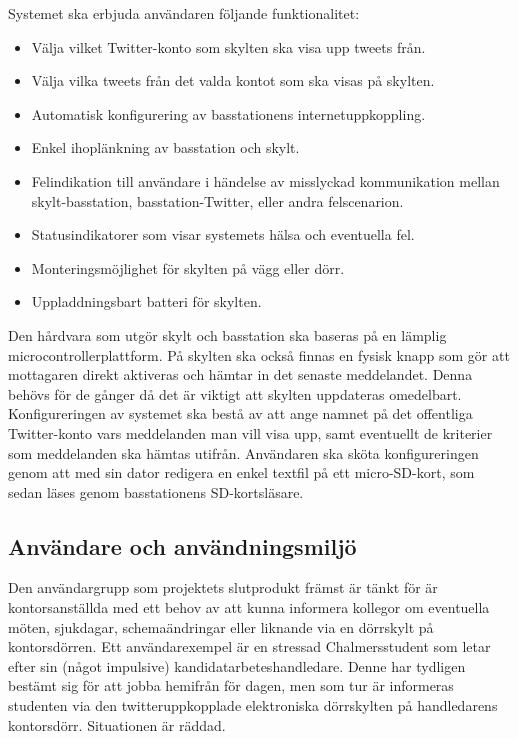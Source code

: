 \documentclass[a4paper,11pt]{article}
\begin{document}
Systemet ska erbjuda användaren följande funktionalitet:
	\begin{itemize}
    	\item Välja vilket Twitter-konto som skylten ska visa upp tweets från.
    	\item Välja vilka tweets från det valda kontot som ska visas på skylten.
    	\item Automatisk konfigurering av basstationens internetuppkoppling.
    	\item Enkel ihoplänkning av basstation och skylt.
    	\item Felindikation till användare i händelse av misslyckad kommunikation mellan skylt-basstation, basstation-Twitter, eller andra felscenarion.
    	\item Statusindikatorer som visar systemets hälsa och eventuella fel.
    	\item Monteringsmöjlighet för skylten på vägg eller dörr.
    	\item Uppladdningsbart batteri för skylten.
    	\end{itemize}
    	
Den hårdvara som utgör skylt och basstation ska baseras på en lämplig microcontrollerplattform. På skylten ska också finnas en fysisk knapp som gör att mottagaren direkt aktiveras och hämtar in det senaste meddelandet. Denna behövs för de gånger då det är viktigt att skylten uppdateras omedelbart.\\

Konfigureringen av systemet ska bestå av att ange namnet på det offentliga Twitter-konto vars meddelanden man vill visa upp, samt eventuellt de kriterier som meddelanden ska hämtas utifrån. Användaren ska sköta konfigureringen genom att med sin dator redigera en enkel textfil på ett micro-SD-kort, som sedan läses genom basstationens SD-kortsläsare.

\subsection{Användare och användningsmiljö}
Den användargrupp som projektets slutprodukt främst är tänkt för är kontorsanställda med ett behov av att kunna informera kollegor om eventuella möten, sjukdagar, schemaändringar eller liknande via en dörrskylt på kontorsdörren. Ett användarexempel är en stressad Chalmersstudent som letar efter sin (något impulsive) kandidatarbeteshandledare. Denne har tydligen bestämt sig för att jobba hemifrån för dagen, men som tur är informeras studenten via den twitteruppkopplade elektroniska dörrskylten på handledarens kontorsdörr. Situationen är räddad.\\
\end{document}
